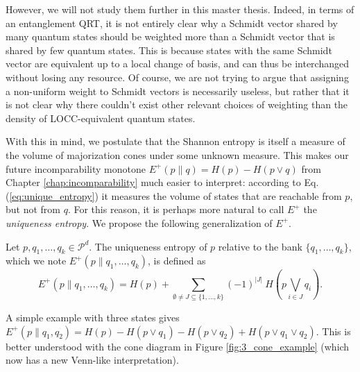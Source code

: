 However, we will not study them further in this master thesis. Indeed, in terms of an entanglement QRT, it is not entirely clear why a Schmidt vector shared by many quantum states should be weighted more than a Schmidt vector that is shared by few quantum states. This is because states with the same Schmidt vector are equivalent up to a local change of basis, and can thus be interchanged without losing any resource. Of course, we are not trying to argue that assigning a non-uniform weight to Schmidt vectors is necessarily useless, but rather that it is not clear why there couldn't exist other relevant choices of weighting than the density of LOCC-equivalent quantum states.

With this in mind, we postulate that the Shannon entropy is itself a measure of the volume of majorization cones under some unknown measure. This makes our future incomparability monotone $E^+(p \parallel q) = H(p) - H(p \vee q)$ from Chapter \ref{chap:incomparability} much easier to interpret: according to Eq. (\ref{eq:unique_entropy}) it measures the volume of states that are reachable from $p$, but not from $q$. For this reason, it is perhaps more natural to call $E^+$ the \textit{uniqueness entropy}. We propose the following generalization of $E^+$.

\begin{definition} \label{def:unique_entropy}
    Let $p, q_1, \dots, q_k \in \mathcal{P}^d$. The uniqueness entropy of $p$ relative to the bank $\{q_1, \dots, q_k\}$, which we note $E^+(p \parallel q_1, \dots, q_k)$, is defined as 
    \begin{equation} \label{eq:unique_entropy}
        E^+(p \parallel q_1, \dots, q_k) = H(p) + \sum_{\emptyset \neq J \subseteq \{1, \dots, k\}} (-1)^{|J|} \: H\left(p \bigvee\limits_{i \in J} q_i\right).
    \end{equation}
\end{definition}

A simple example with three states gives $E^+(p \parallel q_1, q_2) = H(p) - H(p \vee q_1) - H(p \vee q_2) + H(p \vee q_1 \vee q_2)$. This is better understood with the cone diagram in Figure \ref{fig:3_cone_example} (which now has a new Venn-like interpretation).

